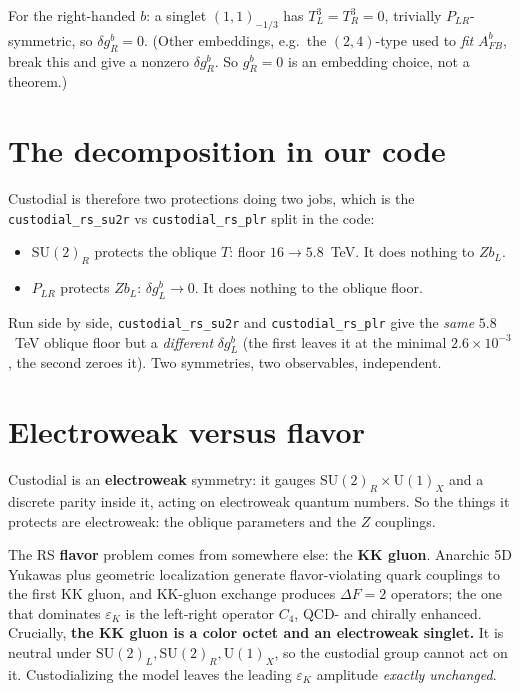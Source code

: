 \documentclass[11pt]{article}
\begin{document}
For the right-handed $b$: a singlet $(1,1)_{-1/3}$ has $T^3_L=T^3_R=0$, trivially
$P_{LR}$-symmetric, so $\delta g_R^b=0$. (Other embeddings, e.g.\ the $(2,4)$-type used
to \emph{fit} $A_{FB}^b$, break this and give a nonzero $\delta g_R^b$. So
$g_R^b=0$ is an embedding choice, not a theorem.)

\section{The decomposition in our code}

Custodial is therefore two protections doing two jobs, which is the
\texttt{custodial\_rs\_su2r} vs \texttt{custodial\_rs\_plr} split in the code:
\begin{itemize}
\item \textbf{$\mathrm{SU(2)}_R$} protects the oblique $T$: floor $16\to5.8$~TeV. It
does nothing to $Z b_L$.
\item \textbf{$P_{LR}$} protects $Z b_L$: $\delta g_L^b\to0$. It does nothing to the
oblique floor.
\end{itemize}
Run side by side, \texttt{custodial\_rs\_su2r} and \texttt{custodial\_rs\_plr} give
the \emph{same} $5.8$~TeV oblique floor but a \emph{different} $\delta g_L^b$ (the
first leaves it at the minimal $2.6\times10^{-3}$, the second zeroes it). Two
symmetries, two observables, independent.

\section{Electroweak versus flavor}

Custodial is an \textbf{electroweak} symmetry: it gauges
$\mathrm{SU(2)}_R\times\mathrm{U(1)}_X$ and a discrete parity inside it, acting on
electroweak quantum numbers. So the things it protects are electroweak: the oblique
parameters and the $Z$ couplings.

The RS \textbf{flavor} problem comes from somewhere else: the \textbf{KK gluon}.
Anarchic 5D Yukawas plus geometric localization generate flavor-violating quark
couplings to the first KK gluon, and KK-gluon exchange produces $\Delta F=2$
operators; the one that dominates $\varepsilon_K$ is the left-right operator $C_4$,
QCD- and chirally enhanced. Crucially, \textbf{the KK gluon is a color octet and
an electroweak singlet.} It is neutral under $\mathrm{SU(2)}_L,\mathrm{SU(2)}_R,
\mathrm{U(1)}_X$, so the custodial group cannot act on it. Custodializing the model
leaves the leading $\varepsilon_K$ amplitude \emph{exactly unchanged}.
\end{document}
